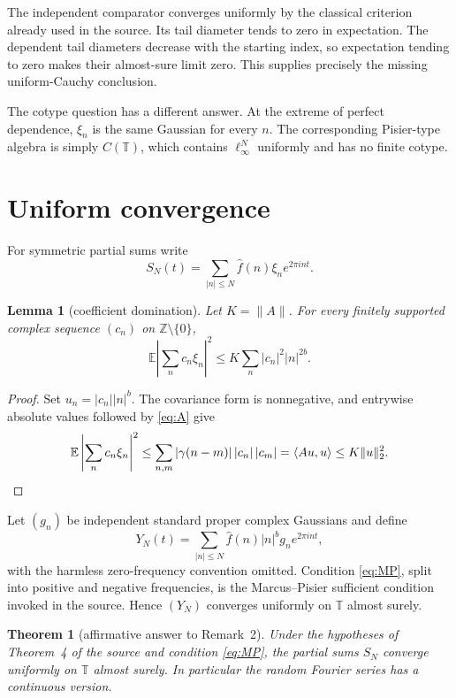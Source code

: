 \documentclass[11pt]{article}
\newtheorem{theorem}{Theorem}
\newtheorem{lemma}{Lemma}
\newcommand{\T}{\mathbb T}
\newcommand{\E}{\mathbb E}
\begin{document}
The independent comparator converges uniformly by the classical criterion
already used in the source.  Its tail diameter tends to zero in expectation.
The dependent tail diameters decrease with the starting index, so expectation
tending to zero makes their almost-sure limit zero.  This supplies precisely
the missing uniform-Cauchy conclusion.

The cotype question has a different answer.  At the extreme of perfect
dependence, $\xi_n$ is the same Gaussian for every $n$.  The corresponding
Pisier-type algebra is simply $C(\T)$, which contains $\ell_\infty^N$
uniformly and has no finite cotype.

\section{Uniform convergence}

For symmetric partial sums write
\[
 S_N(t)=\sum_{|n|\le N}\widehat f(n)\xi_ne^{2\pi int}.
\]

\begin{lemma}[coefficient domination]\label{lem:quad}
Let $K=\|A\|$.  For every finitely supported complex sequence $(c_n)$ on
$\mathbb Z\setminus\{0\}$,
\begin{equation}\label{eq:quad}
 \E\left|\sum_n c_n\xi_n\right|^2
 \le K\sum_n|c_n|^2|n|^{2b}.
\end{equation}
\end{lemma}

\begin{proof}
Set $u_n=|c_n||n|^b$.  The covariance form is nonnegative, and entrywise
absolute values followed by \eqref{eq:A} give
\[
 \E\left|\sum_n c_n\xi_n\right|^2
 \le\sum_{n,m}|\gamma(n-m)|\,|c_n|\,|c_m|
 =\langle Au,u\rangle
 \le K\|u\|_2^2.\qedhere
\]
\end{proof}

Let $(g_n)$ be independent standard proper complex Gaussians and define
\[
 Y_N(t)=\sum_{|n|\le N}\widehat f(n)|n|^b g_ne^{2\pi int},
\]
with the harmless zero-frequency convention omitted.  Condition
\eqref{eq:MP}, split into positive and negative frequencies, is the
Marcus--Pisier sufficient condition invoked in the source.  Hence $(Y_N)$
converges uniformly on $\T$ almost surely.

\begin{theorem}[affirmative answer to Remark~2]\label{thm:uniform}
Under the hypotheses of Theorem~4 of the source and condition
\eqref{eq:MP}, the partial sums $S_N$ converge uniformly on $\T$ almost
surely.  In particular the random Fourier series has a continuous version.
\end{theorem}
\end{document}
